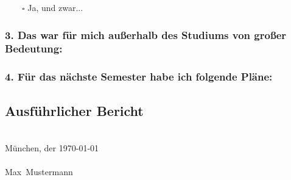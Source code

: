 \documentclass[a4paper,12pt,parskip=full]{article}
\newcommand{\Datum}{\today}
\newcommand{\Nachname}{Mustermann}
\newcommand{\Vorname}{Max}
\newcommand{\Ort}{München}
\begin{document}
~~~~$\square$ Ja, und zwar...
\subsubsection*{3. Das war für mich außerhalb des Studiums von großer Bedeutung:}
\blindtext
\subsubsection*{4. Für das nächste Semester habe ich folgende Pläne:}
\blindtext
\subsection*{Ausführlicher Bericht}
\Blindtext
~\\
\Ort, der \Datum\\
\\
\Vorname~\Nachname
\end{document}
